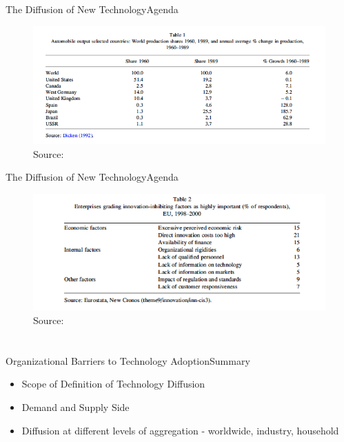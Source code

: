 \documentclass{beamer}
\begin{document}
\begin{frame}{The Diffusion of New Technology}{Agenda}
\begin{figure}[h]
\begin{centering}
  \includegraphics[width=\textwidth]{stoneman1}
  \caption{Source: \cite{Stoneman2010}}
   \label{fig:stoneman1}
\end{centering}
\end{figure}
\end{frame}


\begin{frame}{The Diffusion of New Technology}{Agenda}
\begin{figure}[h]
\begin{centering}
  \includegraphics[width=\textwidth]{stoneman2}
  \caption{Source: \cite{Stoneman2010}}
   \label{fig:stoneman2}
\end{centering}
\end{figure}
\end{frame}




\section{\cite{Atkin2015}}
\begin{frame}{Organizational Barriers to Technology Adoption}{Summary}
\begin{itemize}
\item{Scope of Definition of Technology Diffusion}
\item{Demand and Supply Side}
\item{Diffusion at different levels of aggregation - worldwide, industry, household}
\end{itemize}
\end{frame}
\end{document}
